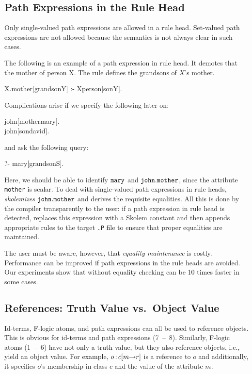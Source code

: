 \documentclass[11pt]{report}
\begin{document}
\subsection{Path Expressions in the Rule Head}

Only single-valued path expressions are allowed in a rule head. Set-valued
path expressions are not allowed because the semantics is not always clear
in such cases.

The following is an example of a path expression in rule head. It demotes
that the mother of person X. The rule defines the grandsons of $X$'s
mother.
\begin{qrules}
X.mother[grandson{\mvd}Y] :- X{\isa}person[son{\mvd}Y].
\end{qrules}
Complications arise if we specify the following later on:
\begin{qrules}
john[mother{\fd}mary]. \\
john[son{\mvd}david].
\end{qrules}
and ask the following query:
\begin{qrules}
?- mary[grandson{\mvd}S].
\end{qrules}

Here, we should be able to identify ${\tt mary}$ and ${\tt john.mother}$,
since the attribute {\tt mother} is scalar. To deal with single-valued path
expressions in rule heads, \FLORA \emph{skolemizes} ${\tt john.mother}$ and
derives the requisite equalities.  All this is done by the
\FLORA compiler transparently to the user: if a path expression in rule head
is detected, \FLORA replaces this expression with a Skolem constant and
then appends appropriate rules to the target {\tt .P} file to ensure that
proper equalities are maintained.

The user must be aware, however, that \emph{equality maintenance} is costly.
Performance can be improved if path expressions in the rule heads are
avoided.  Our experiments show that without equality checking \FLORA can be
10 times faster in some cases.


\subsection{References: Truth Value vs.\ Object Value}\label{sec-references}

Id-terms, F-logic atoms, and path expressions can all be used to
reference objects. This is obvious for id-terms and path
expressions (7~--~8). Similarly, F-logic atoms (1~--~6) have not only a
truth value, but they also reference objects, i.e., yield an object value.
For example, $o\,{\bf{:}}\, c[m{\rightarrow} r]$ is a reference to $o$ and additionally,
it specifies $o$'s membership in class $c$ and the value of the attribute $m$.
\end{document}
